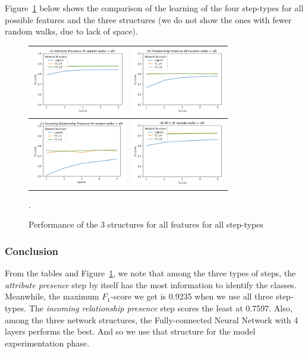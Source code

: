 \documentclass[runningheads,a4paper]{IEEEtran}
\begin{document}
Figure~\ref{1xall} below shows the comparison of the learning of the four step-types for all possible features and the three structures (we do not show the ones with fewer random walks, due to lack of space). 
\begin{figure}[h]
\centering
  \begin{tabular}{| c | c |}
\hline
\includegraphics[width=1.6in]{figures/attr_1xall.png} & \includegraphics[width=1.6in]{figures/rel_1xall.png} \\
\hline
\includegraphics[width=1.6in]{figures/inRel_1xall.png} & \includegraphics[width=1.6in]{figures/all3_1xall.png} \\
\hline
\end{tabular}
\caption{Performance of the 3 structures for all features for all step-types}
\label{1xall}.
\end{figure}

\subsubsection{Conclusion} From the tables and Figure~\ref{1xall}, we note that among the three types of steps, the \textit{attribute presence} step by itself has the most information to identify the classes. Meanwhile, the maximum $F_1$-score we get is 0.9235 when we use all three step-types. The \textit{incoming relationship presence} step scores the least at 0.7597. Also, among the three network structures, the Fully-connected Neural Network with 4 layers performs the best. And so we use that structure for the model experimentation phase. 
\end{document}
